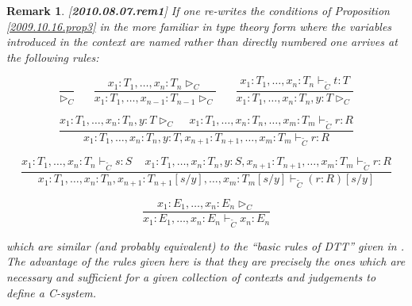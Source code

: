 \documentclass[11pt]{article}
\newtheorem{remark}[proposition]{Remark}
\newcommand{\llabel}[1]{\label{#1}[{\bf #1}]}
\newcommand{\wt}{\widetilde}
\begin{document}
\begin{remark}\rm\llabel{2010.08.07.rem1} If one re-writes the conditions of Proposition \ref{2009.10.16.prop3} in the more familiar in type theory form where the variables introduced in the context are named rather than directly numbered one arrives at the following rules:

\begin{center}

$$\frac{}{\rhd_{C}}\,\,\,\,\,\,\,\,\,\,
\frac{x_1:T_1,\dots,x_n:T_n\rhd_{C}}{x_1:T_1,\dots,x_{n-1}:T_{n-1}\rhd_{C}} \,\,\,\,\,\,\,\,\,\, 
\frac{x_1:T_1,\dots,x_n:T_n\vdash_{\wt{C}} t:T}{x_1:T_1,\dots,x_n:T_n, y:T\rhd_{C}}$$

$$\frac{x_1:T_1,\dots,x_n:T_n, y:T\rhd_{C}\,\,\,\,\,\,\,x_1:T_1,\dots,x_n:T_n,\dots, x_m:T_m\vdash_{\wt{C}} r:R}{x_1:T_1,\dots,x_n:T_n, y:T, x_{n+1}:T_{n+1},\dots,x_m:T_m\vdash_{\wt{C}} r:R}$$

$$\frac{x_1:T_1,\dots,x_n:T_n\vdash_{\wt{C}} s:S\,\,\,\,\,\,\,x_1:T_1,\dots,x_n:T_n,y:S,x_{n+1}:T_{n+1},\dots,x_m:T_m\vdash_{\wt{C}} r:R}
{x_1:T_1,\dots,x_n:T_n,x_{n+1}:T_{n+1}[s/y],\dots,x_m:T_m[s/y]\vdash_{\wt{C}} (r:R)[s/y]}$$

$$\frac{x_1:E_1,\dots,x_n:E_n\rhd_{C}}{x_1:E_1,\dots,x_n:E_n\vdash_{\wt{C}} x_n:E_n}$$

\end{center}
%
which are similar (and probably equivalent) to the ``basic rules of DTT'' given in \cite[p.585]{Jacobs1}. The advantage of the rules given here is that they are precisely the ones which are necessary and sufficient for a given collection of contexts and judgements to define a C-system.

\end{remark}
\end{document}
